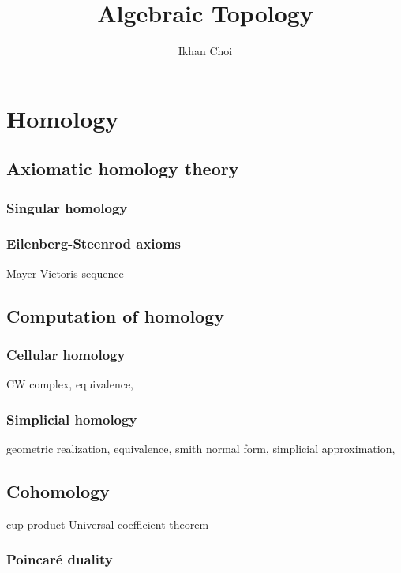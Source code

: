 \documentclass{../../large}
\begin{document}
\title{Algebraic Topology}
\author{Ikhan Choi}
\maketitle
\tableofcontents


\part{Homology}


\chapter{Axiomatic homology theory}

\section{Singular homology}

\section{Eilenberg-Steenrod axioms}
Mayer-Vietoris sequence




\chapter{Computation of homology}

\section{Cellular homology}
CW complex,
equivalence,

\section{Simplicial homology}
geometric realization,
equivalence,
smith normal form,
simplicial approximation,




\chapter{Cohomology}

cup product
Universal coefficient theorem

\section{Poincar\'e duality}
\end{document}
